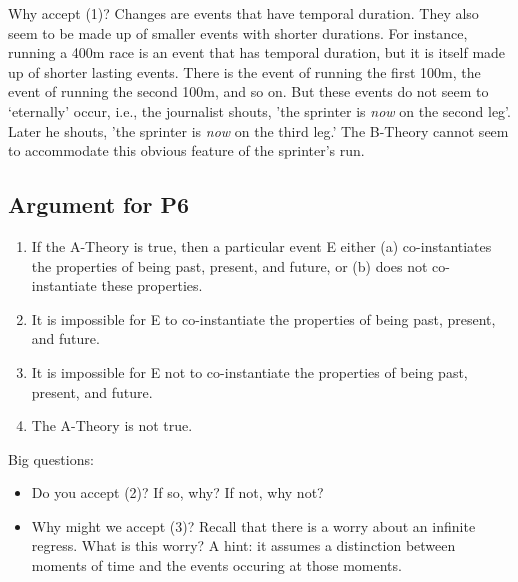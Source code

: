 \documentclass[]{article}
\begin{document}
Why accept (1)?  Changes are events that have temporal duration. They also seem to be made up of smaller events with shorter durations. For instance, running a 400m race is an event that has temporal duration, but it is itself made up of shorter lasting events. There is the event of running the first 100m, the event of running the second 100m, and so on. But these events do not seem to `eternally' occur, i.e., the journalist shouts, 'the sprinter is \emph{now} on the second leg'. Later he shouts, 'the sprinter is \emph{now} on the third leg.'  The B-Theory cannot seem to accommodate this obvious feature of the sprinter's run. 
 

\subsection*{Argument for P6}

\begin{enumerate}
\item If the A-Theory is true, then a particular event E either (a) co-instantiates the properties of being past, present, and future, or (b) does not co-instantiate these properties. 
\item It is impossible for E to co-instantiate the properties of being past, present, and future.
\item It is impossible for E not to co-instantiate the properties of being past, present, and future. 
\item The A-Theory is not true. 
\end{enumerate}
Big questions:
\begin{itemize}
\item Do you accept (2)? If so, why? If not, why not? 
\item Why might we accept (3)? Recall that there is a worry about an infinite regress. What is this worry? A hint: it assumes a distinction between moments of time and the events occuring at those moments.
\end{itemize}
\end{document}
